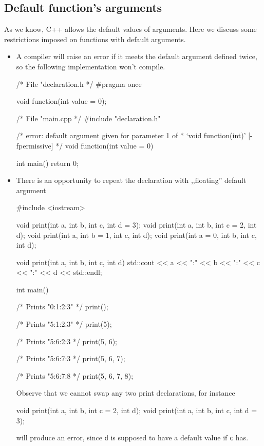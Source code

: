 \documentclass[../main]{subfiles}
\begin{document}
\subsection{Default function's arguments}
    As we know, C++ allows the default values of arguments. Here we discuss some restrictions imposed on functions with default arguments.
\begin{itemize}
    \item A compiler will raise an error if it meets the default argument defined twice, so the following implementation won't compile.
    \begin{Code}
        /* File "declaration.h */
        #pragma once
        
        void function(int value = 0);

        
        /* File "main.cpp */
        #include "declaration.h"

        /* error: default argument given for parameter 1 of
         * ‘void function(int)’ [-fpermissive]
         */
        void function(int value = 0) {}
        
        int main()
        {
            return 0;
        }
    \end{Code}

    \item There is an opportunity to repeat the declaration with ,,floating'' default argument
    \begin{Code}
        #include <iostream>
        
        void print(int a, int b, int c, int d = 3);
        void print(int a, int b, int c = 2, int d);
        void print(int a, int b = 1, int c, int d);
        void print(int a = 0, int b, int c, int d);
        
        void print(int a, int b, int c, int d)
        {
            std::cout << a << ":" << b << ":"
                      << c << ":" << d << std::endl;
        }
        
        int main()
        {
            /* Prints "0:1:2:3" */
            print();
            
            /* Prints "5:1:2:3" */
            print(5);

            /* Prints "5:6:2:3 */
            print(5, 6);

            /* Prints "5:6:7:3 */
            print(5, 6, 7);

            /* Prints "5:6:7:8 */
            print(5, 6, 7, 8);
        }
    \end{Code}
    \noindent
    Observe that we cannot swap any two print declarations, for instance
    \begin{Code}
        void print(int a, int b, int c = 2, int d);
        void print(int a, int b, int c, int d = 3);
    \end{Code}
    will produce an error, since \texttt{d} is supposed to have a default value if \texttt{c} has.


\end{itemize}
\end{document}
